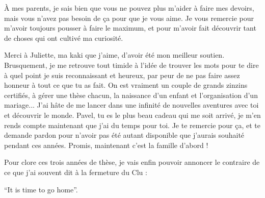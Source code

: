 \bigskip

À mes parents, je sais bien que vous ne pouvez plus m'aider à faire mes devoirs, mais vous n'avez pas besoin de ça pour que je vous aime. Je vous remercie pour m'avoir toujours pousser à faire le maximum, et pour m'avoir fait découvrir tant de choses qui ont cultivé ma curiosité.

\bigskip

Merci à Juliette, ma kaki que j'aime, d'avoir été mon meilleur soutien. Brusquement, je me retrouve tout timide à l'idée de trouver les mots pour te dire à quel point je suis reconnaissant et heureux, par peur de ne pas faire assez honneur à tout ce que tu as fait. On est vraiment un couple de grands zinzins certifiés, à gérer une thèse chacun, la naissance d'un enfant et l'organisation d'un mariage... J'ai hâte de me lancer dans une infinité de nouvelles aventures avec toi et découvrir le monde. Pavel, tu es le plus beau cadeau qui me soit arrivé, je m'en rends compte maintenant que j'ai du temps pour toi. Je te remercie pour ça, et te demande pardon pour n'avoir pas été autant disponible que j'aurais souhaité pendant ces années. Promis, maintenant c'est la famille d'abord !


\vfill



\begin{center}
    Pour clore ces trois années de thèse, je vais enfin pouvoir annoncer le contraire de ce que j'ai souvent dit à la fermeture du Clu : 
    
    ``It is time to go home''.
    
\end{center}


\vfill